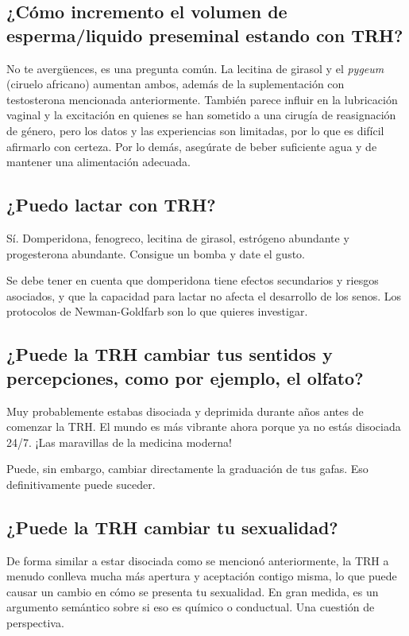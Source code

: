 \documentclass{article}
\begin{document}
\subsection{¿Cómo incremento el volumen de esperma/liquido preseminal estando con TRH?}

No te avergüences, es una pregunta común. La lecitina de girasol y el \textit{pygeum} (ciruelo africano) aumentan ambos, además de la suplementación con testosterona mencionada anteriormente. También parece influir en la lubricación vaginal y la excitación en quienes se han sometido a una cirugía de reasignación de género, pero los datos y las experiencias son limitadas, por lo que es difícil afirmarlo con certeza. Por lo demás, asegúrate de beber suficiente agua y de mantener una alimentación adecuada.

\subsection{¿Puedo lactar con TRH?}

Sí. Domperidona, fenogreco, lecitina de girasol, estrógeno abundante y progesterona abundante. Consigue un bomba y date el gusto.

Se debe tener en cuenta que domperidona tiene efectos secundarios y riesgos asociados, y que la capacidad para lactar no afecta el desarrollo de los senos. Los protocolos de Newman-Goldfarb son lo que quieres investigar.

\subsection{¿Puede la TRH cambiar tus sentidos y percepciones, como por ejemplo, el olfato?}

Muy probablemente estabas disociada y deprimida durante años antes de comenzar la TRH. El mundo es más vibrante ahora porque ya no estás disociada 24/7. ¡Las maravillas de la medicina moderna!

Puede, sin embargo, cambiar directamente la graduación de tus gafas. Eso definitivamente puede suceder.

\subsection{¿Puede la TRH cambiar tu sexualidad?}

De forma similar a estar disociada como se mencionó anteriormente, la TRH a menudo conlleva mucha más apertura y aceptación contigo misma, lo que puede causar un cambio en cómo se presenta tu sexualidad. En gran medida, es un argumento semántico sobre si eso es químico o conductual. Una cuestión de perspectiva.
\end{document}
